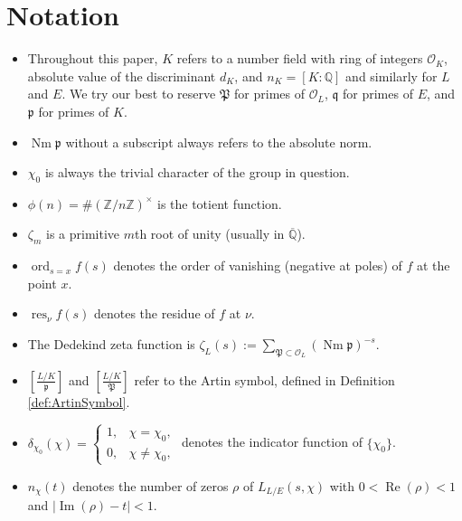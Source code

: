 \documentclass[12pt]{amsart}
\theoremstyle{definition}
\theoremstyle{remark}
\numberwithin{equation}{section}
\newcommand{\cO}{\mathcal O}
\newcommand{\fkp}{\mathfrak p}
\newcommand{\fkq}{\mathfrak q}
\newcommand{\fkP}{\mathfrak{P}}
\newcommand{\bbQ}{\mathbb Q}
\newcommand{\bbZ}{\mathbb Z}
\DeclareMathOperator{\norm}{Nm}
\DeclareMathOperator{\re}{Re}
\DeclareMathOperator{\im}{Im}
\newcommand{\artin}[2]{\left[ \frac{#1}{#2}\right]}
\DeclareMathOperator{\ord}{ord}
\DeclareMathOperator{\residue}{res}
\begin{document}

\appendix
\section{Notation}

\begin{itemize}
\item Throughout this paper, $K$ refers to a number field with ring of integers $\cO_{K}$, absolute value of the discriminant $d_{K}$, and $n_{K} = [K:\bbQ]$ and similarly for $L$ and $E$. We try our best to reserve $\fkP$ for primes of $\cO_{L}$, $\fkq$ for primes of $E$, and $\fkp$ for primes of $K$. 
\item $\norm \fkp$ without a subscript always refers to the absolute norm.
\item $\chi_{0}$ is always the trivial character of the group in question.
\item $\phi(n) = \# (\bbZ/n\bbZ)^{\times}$ is the totient function.
\item $\zeta_{m}$ is a primitive $m$th root of unity (usually in $\overline{\bbQ}$).
\item $\ord_{s = x}f(s)$ denotes the order of vanishing (negative at poles) of $f$ at the point $x$.
\item $\residue_{\nu}f(s)$ denotes the residue of $f$ at $\nu$.
\item The Dedekind zeta function is $\zeta_{L}(s) := \sum_{\fkP \subset \cO_{L}} (\norm \fkp)^{-s}$.
\item $\artin{L/K}{\fkp}$ and $\artin{L/K}{\fkP}$ refer to the Artin symbol, defined in Definition \ref{def:ArtinSymbol}.
\item $\delta_{\chi_{0}}(\chi) = \begin{cases} 1, & \chi = \chi_{0}, \\
0, & \chi \neq \chi_{0}, \end{cases}$ denotes the indicator function of $\{\chi_{0}\}$.
\item $n_{\chi}(t)$ denotes the number of zeros $\rho$ of $L_{L/E}(s,\chi)$ with $0 < \re(\rho) < 1$ and $|\im(\rho) - t| < 1$.
\end{itemize}






\end{document}

